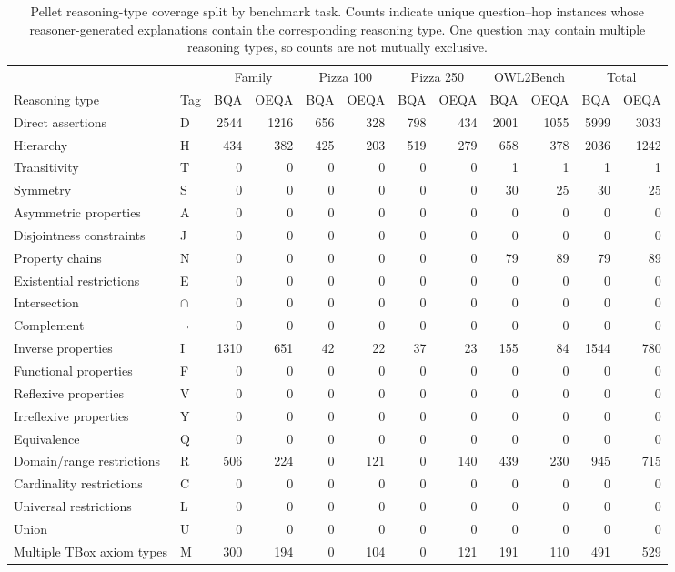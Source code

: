 \begin{table}[t]
\centering
\caption{Pellet reasoning-type coverage split by benchmark task. Counts indicate unique question--hop instances whose reasoner-generated explanations contain the corresponding reasoning type. One question may contain multiple reasoning types, so counts are not mutually exclusive.}
\label{tab:reasoning-type-coverage-by-task}
\begin{tabular}{llrrrrrrrrrr}
\toprule
& & \multicolumn{2}{c}{Family} & \multicolumn{2}{c}{Pizza 100} & \multicolumn{2}{c}{Pizza 250} & \multicolumn{2}{c}{OWL2Bench} & \multicolumn{2}{c}{Total} \\
\cmidrule(lr){3-4}\cmidrule(lr){5-6}\cmidrule(lr){7-8}\cmidrule(lr){9-10}\cmidrule(lr){11-12}
Reasoning type & Tag & BQA & OEQA & BQA & OEQA & BQA & OEQA & BQA & OEQA & BQA & OEQA \\
\midrule
Direct assertions & D & 2544 & 1216 & 656 & 328 & 798 & 434 & 2001 & 1055 & 5999 & 3033 \\
Hierarchy & H & 434 & 382 & 425 & 203 & 519 & 279 & 658 & 378 & 2036 & 1242 \\
Transitivity & T & 0 & 0 & 0 & 0 & 0 & 0 & 1 & 1 & 1 & 1 \\
Symmetry & S & 0 & 0 & 0 & 0 & 0 & 0 & 30 & 25 & 30 & 25 \\
Asymmetric properties & A & 0 & 0 & 0 & 0 & 0 & 0 & 0 & 0 & 0 & 0 \\
Disjointness constraints & J & 0 & 0 & 0 & 0 & 0 & 0 & 0 & 0 & 0 & 0 \\
Property chains & N & 0 & 0 & 0 & 0 & 0 & 0 & 79 & 89 & 79 & 89 \\
Existential restrictions & E & 0 & 0 & 0 & 0 & 0 & 0 & 0 & 0 & 0 & 0 \\
Intersection & $\cap$ & 0 & 0 & 0 & 0 & 0 & 0 & 0 & 0 & 0 & 0 \\
Complement & $\neg$ & 0 & 0 & 0 & 0 & 0 & 0 & 0 & 0 & 0 & 0 \\
Inverse properties & I & 1310 & 651 & 42 & 22 & 37 & 23 & 155 & 84 & 1544 & 780 \\
Functional properties & F & 0 & 0 & 0 & 0 & 0 & 0 & 0 & 0 & 0 & 0 \\
Reflexive properties & V & 0 & 0 & 0 & 0 & 0 & 0 & 0 & 0 & 0 & 0 \\
Irreflexive properties & Y & 0 & 0 & 0 & 0 & 0 & 0 & 0 & 0 & 0 & 0 \\
Equivalence & Q & 0 & 0 & 0 & 0 & 0 & 0 & 0 & 0 & 0 & 0 \\
Domain/range restrictions & R & 506 & 224 & 0 & 121 & 0 & 140 & 439 & 230 & 945 & 715 \\
Cardinality restrictions & C & 0 & 0 & 0 & 0 & 0 & 0 & 0 & 0 & 0 & 0 \\
Universal restrictions & L & 0 & 0 & 0 & 0 & 0 & 0 & 0 & 0 & 0 & 0 \\
Union & U & 0 & 0 & 0 & 0 & 0 & 0 & 0 & 0 & 0 & 0 \\
Multiple TBox axiom types & M & 300 & 194 & 0 & 104 & 0 & 121 & 191 & 110 & 491 & 529 \\
\bottomrule
\end{tabular}
\end{table}
